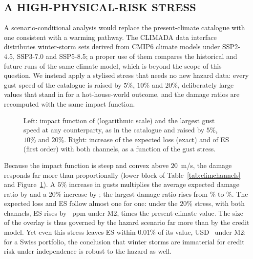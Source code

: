 \begin{table}[tb]
\caption{IRB capital of Section~\ref{sec:irb} with physical risk in the formula of \citet{Pozdyshev25}: LGD add-on only, both channels (stressed PD from the $q$-deformed mixture, event independent of the systematic factor), and the climate-adjusted PD plugged into the standard formula.}
\label{tab:climirb}
\centering
{}
\end{table}

\subsection{A HIGH-PHYSICAL-RISK STRESS}
\label{subsec:climstress}
A scenario-conditional analysis would replace the present-climate catalogue with one consistent with a warming pathway. The CLIMADA data interface distributes winter-storm sets derived from CMIP6 climate models under SSP2-4.5, SSP3-7.0 and SSP5-8.5; a proper use of them compares the historical and future runs of the same climate model, which is beyond the scope of this question. We instead apply a stylised stress that needs no new hazard data: every gust speed of the catalogue is raised by $5\%$, $10\%$ and $20\%$, deliberately large values that stand in for a hot-house-world outcome, and the damage ratios are recomputed with the same impact function.

\begin{figure}[tb]
\centering
{}
\caption{Left: impact function of \citet{Welker21} (logarithmic scale) and the largest gust speed at any counterparty, as in the catalogue and raised by $5\%$, $10\%$ and $20\%$. Right: increase of the expected loss (exact) and of ES (first order) with both channels, as a function of the gust stress.}
\label{fig:climstress}
\end{figure}

Because the impact function is steep and convex above $20$~m/s, the damage responds far more than proportionally (lower block of Table~\ref{tab:climchannels} and Figure~\ref{fig:climstress}). A $5\%$ increase in gusts multiplies the average expected damage ratio by  and a $20\%$ increase by ; the largest damage ratio rises from \% to \%. The expected loss and ES follow almost one for one: under the $20\%$ stress, with both channels, ES rises by ~ppm under M2,  times the present-climate value. The size of the overlay is thus governed by the hazard scenario far more than by the credit model. Yet even this stress leaves ES within $0.01\%$ of its value, USD~ under M2: for a Swiss portfolio, the conclusion that winter storms are immaterial for credit risk under independence is robust to the hazard as well.
